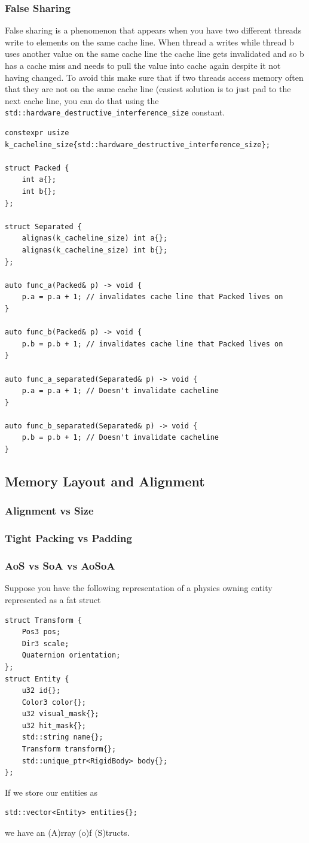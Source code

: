 \documentclass{article}
\begin{document}
\subsubsection{False Sharing}
False sharing is a phenomenon that appears when you have two different threads write to elements on the same cache line. When thread a writes while thread b uses another value on the same cache line the cache line gets invalidated and so b has a cache miss and needs to pull the value into cache again despite it not having changed. To avoid this make sure that if two threads access memory often that they are not on the same cache line (easiest solution is to just pad to the next cache line, you can do that using the \texttt{std::hardware\_destructive\_interference\_size} constant.
\begin{lstlisting}
constexpr usize k_cacheline_size{std::hardware_destructive_interference_size};

struct Packed {
    int a{};
    int b{};
};

struct Separated {
    alignas(k_cacheline_size) int a{};
    alignas(k_cacheline_size) int b{};
};

auto func_a(Packed& p) -> void {
    p.a = p.a + 1; // invalidates cache line that Packed lives on
}

auto func_b(Packed& p) -> void {
    p.b = p.b + 1; // invalidates cache line that Packed lives on
}

auto func_a_separated(Separated& p) -> void {
    p.a = p.a + 1; // Doesn't invalidate cacheline
}

auto func_b_separated(Separated& p) -> void {
    p.b = p.b + 1; // Doesn't invalidate cacheline
}

\end{lstlisting}

\subsection{Memory Layout and Alignment}
\subsubsection{Alignment vs Size}
\subsubsection{Tight Packing vs Padding}
\subsubsection{AoS vs SoA vs AoSoA}
Suppose you have the following representation of a physics owning entity represented as a fat struct
\begin{lstlisting}
struct Transform {
    Pos3 pos;
    Dir3 scale;
    Quaternion orientation;
};
struct Entity {
    u32 id{};
    Color3 color{};
    u32 visual_mask{};
    u32 hit_mask{};
    std::string name{};
    Transform transform{};
    std::unique_ptr<RigidBody> body{};
};
\end{lstlisting}
If we store our entities as
\begin{lstlisting}
std::vector<Entity> entities{};
\end{lstlisting}
we have an (A)rray (o)f (S)tructs.
\end{document}
